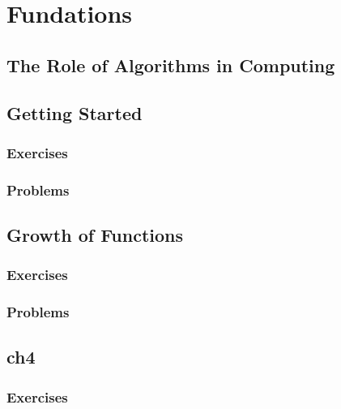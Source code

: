 \documentclass[a4paper, 11pt, fleqn]{report}
\begin{document}
    \tableofcontents
    \part{Fundations}
        \chapter{The Role of Algorithms in Computing}

        \chapter{Getting Started}
            \section*{Exercises}
                
                
                
            \section*{Problems}
                
                
                
                
        \chapter{Growth of Functions}
            \section*{Exercises}
                
                
            \section*{Problems}
                
                
        \chapter{ch4}
            \section*{Exercises}
                
\end{document}
